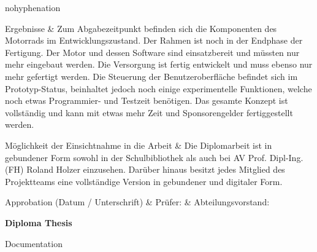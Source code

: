 {\begin{hyphenrules}{nohyphenation}
\begin{center}
			\begin{mytable}
				Ergebnisse & Zum Abgabezeitpunkt befinden sich die Komponenten des Motorrads im Entwicklungszustand. Der Rahmen ist noch in der Endphase der Fertigung. Der Motor und dessen Software sind einsatzbereit und müssten nur mehr eingebaut werden. Die Versorgung ist fertig entwickelt und muss ebenso nur mehr gefertigt werden. Die Steuerung der Benutzeroberfläche befindet sich im Prototyp-Status, beinhaltet jedoch noch einige experimentelle Funktionen, welche noch etwas Programmier- und Testzeit benötigen. Das gesamte Konzept ist vollständig und kann mit etwas mehr Zeit und Sponsorengelder fertiggestellt werden. \\
			\end{mytable}\vskip-0.42cm
			\begin{mytable}
				Möglichkeit der Einsichtnahme in die Arbeit & Die Diplomarbeit ist in gebundener Form sowohl in der Schulbibliothek als auch bei AV Prof. Dipl-Ing. (FH) Roland Holzer einzusehen. Darüber hinaus besitzt jedes Mitglied des Projektteams eine vollständige Version in gebundener und digitaler Form.\\
			\end{mytable}\vskip-0.42cm
			\begin{mytable}[{|X[0.995,c]|X[1,m]|X[1,m]|}]
				Approbation \newline (Datum / Unterschrift) &
				\hbox{\footnotesize{Prüfer:}} &
				\hbox{\footnotesize{Abteilungsvorstand:}} \\
				\hline
			\end{mytable}
		\end{center}
	\end{hyphenrules}

\newpage

	\centering
\begin{huge}
	\textbf{Diploma Thesis}
\end{huge}

\begin{large}
	 Documentation
\end{large}

}
